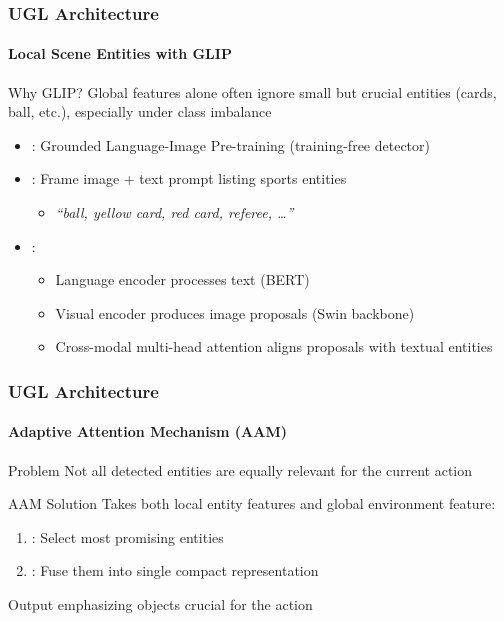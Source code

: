 \documentclass[aspectratio=169, lecture, amberg]{OTHAWbeamer}
\begin{document}
\begin{frame}
\frametitle{UGL Architecture}
\framesubtitle{Local Scene Entities with GLIP}
\begin{block}{Why GLIP?}
Global features alone often ignore small but crucial entities (cards, ball, etc.), especially under class imbalance
\end{block}

\begin{itemize}
\item {}: Grounded Language-Image Pre-training (training-free detector)
\item {}: Frame image + text prompt listing sports entities
	\begin{itemize}
	\item \textit{``ball, yellow card, red card, referee, \ldots''}
	\end{itemize}
\item {}: 
	\begin{itemize}
	\item Language encoder processes text (BERT)
	\item Visual encoder produces image proposals (Swin backbone)
	\item Cross-modal multi-head attention aligns proposals with textual entities
	\end{itemize}
\end{itemize}
\end{frame}

\begin{frame}
\frametitle{UGL Architecture}
\framesubtitle{Adaptive Attention Mechanism (AAM)}
\begin{block}{Problem}
Not all detected entities are equally relevant for the current action
\end{block}

\begin{block}{AAM Solution}
Takes both local entity features and global environment feature:
\begin{enumerate}
\item {}: Select most promising entities
\item {}: Fuse them into single compact representation
\end{enumerate}
\end{block}

\begin{block}{Output}
 emphasizing objects crucial for the action
\end{block}
\end{frame}
\end{document}

